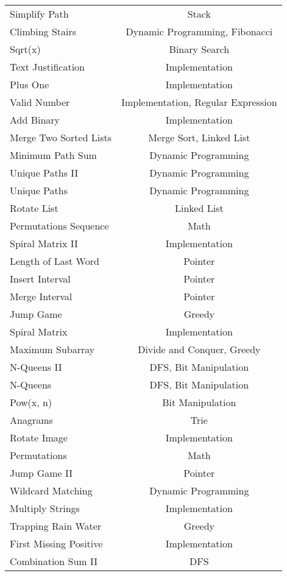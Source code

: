 \documentclass[paper=a4, fontsize=11pt]{scrartcl} %
\begin{document}
\begin{center}
\begin{longtable}{|l|c|}
    Simplify Path   &   Stack   \\
    Climbing Stairs &   Dynamic Programming, Fibonacci  \\
    Sqrt(x) &   Binary Search   \\
    Text Justification  &   Implementation  \\
    Plus One    &   Implementation  \\
    Valid Number    &   Implementation, Regular Expression   \\
    Add Binary  &   Implementation  \\
    Merge Two Sorted Lists  &   Merge Sort, Linked List \\
    Minimum Path Sum  & Dynamic Programming \\
    Unique Paths II & Dynamic Programming  \\
    Unique Paths & Dynamic Programming  \\
    Rotate List & Linked List \\
    Permutations Sequence & Math  \\
    Spiral Matrix II  & Implementation  \\
    Length of Last Word & Pointer \\
    Insert Interval & Pointer \\
    Merge Interval  & Pointer \\
    Jump Game & Greedy  \\
    Spiral Matrix & Implementation  \\
    Maximum Subarray    &   Divide and Conquer, Greedy  \\
    N-Queens II    &   DFS, Bit Manipulation \\
    N-Queens    &   DFS, Bit Manipulation \\
    Pow(x, n)   &   Bit Manipulation    \\
    Anagrams    &   Trie    \\
    Rotate Image    &   Implementation  \\
    Permutations    &   Math    \\
    Jump Game II    &   Pointer\\
    Wildcard Matching   &   Dynamic Programming \\
    Multiply Strings    &   Implementation  \\
    Trapping Rain Water     &   Greedy  \\
    First Missing Positive  &   Implementation  \\
    Combination Sum II  &   DFS  \\

\end{longtable}
\end{center}
\end{document}
